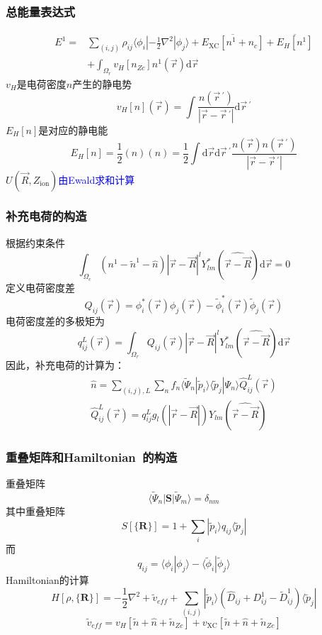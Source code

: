 \frame
{
	\frametitle{总能量表达式}
	\begin{displaymath}
		\begin{aligned}
			E^1=&\sum_{(i,j)}\rho_{ij}\langle\phi_i|-\frac12\nabla^2|\phi_j\rangle+\overline{E_{\mathrm{XC}}[n^1+n_c]}+\overline{E_H[n^1]}\\
			&+\int_{\Omega_r}v_H[n_{Zc}]n^1(\vec r)\mathrm{d}\vec r
		\end{aligned}
	\end{displaymath}
	$v_H$是电荷密度$n$产生的静电势
	$$v_H[n](\vec r)=\int\dfrac{n(\vec r\,^{\prime})}{|\vec r-\vec r\,^{\prime}|}\mathrm{d}\vec r\,^{\prime}$$
	$E_H[n]$是对应的静电能
	$$E_H[n]=\dfrac12(n)(n)=\dfrac12\int\mathrm{d}\vec r\mathrm{d}\vec r\,^{\prime}\dfrac{n(\vec r)n(\vec r\,^{\prime})}{|\vec r-\vec r\,^{\prime}|}$$ 
	$U(\vec R,Z_{\mathrm{ion}})$\textcolor{blue}{由\textrm{Ewald}求和计算}
}

\frame
{
	\frametitle{补充电荷的构造}
	根据约束条件
	\begin{displaymath}
		\int_{\Omega_c}(n^1-\tilde n^1-\hat n)|\vec r-\vec R|^lY_{lm}^{\ast}(\widehat{\vec r-\vec R})\mathrm{d}\vec r=0
	\end{displaymath}
	定义电荷密度差
	\begin{displaymath}
		Q_{ij}(\vec r)=\phi_i^{\ast}(\vec r)\phi_j(\vec r)-\tilde\phi_i^{\ast}(\vec r)\tilde\phi_j(\vec r)
	\end{displaymath}
	电荷密度差的多极矩为
	\begin{displaymath}
		q_{ij}^L(\vec r)=\int_{\Omega_r}Q_{ij}(\vec r)|\vec r-\vec R|^lY_{lm}^{\ast}(\widehat{\vec r-\vec R})\mathrm{d}\vec r
	\end{displaymath}
	因此，补充电荷的计算为：
	\begin{displaymath}
		\begin{aligned}
			\hat n=\sum_{(i,j),L}\sum_n f_n\langle\tilde\Psi_n|\tilde p_i\rangle\langle\tilde p_j|\Psi_n\rangle\hat Q_{ij}^L(\vec r)\\
			\hat Q_{ij}^L(\vec r)=q_{ij}^Lg_l(|\vec r-\vec R|)Y_{lm}(\widehat{\vec r-\vec R})
		\end{aligned}
	\end{displaymath}
}

\frame
{
	\frametitle{重叠矩阵和\textrm{Hamiltonian~}的构造}
重叠矩阵
	\begin{displaymath}
		\langle\tilde\Psi_n|\mathbf{S}|\tilde\Psi_m\rangle=\delta_{nm}
	\end{displaymath}
	其中重叠矩阵$$S[\{\mathbf{R}\}]=1+\sum_i|\tilde p_i\rangle q_{ij}\langle\tilde p_j|$$
	而$$q_{ij}=\langle\phi_i|\phi_j\rangle-\langle\tilde\phi_i|\tilde\phi_j\rangle$$
	\textrm{Hamiltonian}的计算
	\begin{displaymath}
		H[\rho,\{\mathbf{R}\}]=-\dfrac12\nabla^2+\tilde v_{e\!f\!f}+\sum_{(i,j)}|\tilde p_i\rangle(\hat D_{ij}+D_{ij}^1-\tilde D_{ij}^1)\langle\tilde p_j|	
	\end{displaymath}
	$$\tilde v_{e\!f\!f}=v_H[\tilde n+\hat n+\tilde n_{Zc}]+v_{\mathrm{XC}}[\tilde n+\hat n+\tilde n_{Zc}]$$
}


